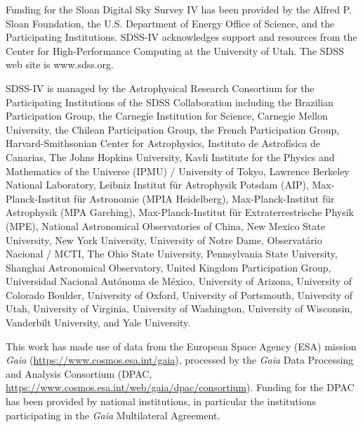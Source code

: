 \documentclass[modern]{aastex63}
\begin{document}
Funding for the Sloan Digital Sky Survey IV has been provided by the Alfred P.
Sloan Foundation, the U.S. Department of Energy Office of Science, and the
Participating Institutions. SDSS-IV acknowledges support and resources from the
Center for High-Performance Computing at the University of Utah. The SDSS web
site is www.sdss.org.

SDSS-IV is managed by the Astrophysical Research Consortium for the
Participating Institutions of the SDSS Collaboration including the Brazilian
Participation Group, the Carnegie Institution for Science, Carnegie Mellon
University, the Chilean Participation Group, the French Participation Group,
Harvard-Smithsonian Center for Astrophysics, Instituto de Astrof\'isica de
Canarias, The Johns Hopkins University, Kavli Institute for the Physics and
Mathematics of the Universe (IPMU) / University of Tokyo, Lawrence Berkeley
National Laboratory, Leibniz Institut f\"ur Astrophysik Potsdam (AIP),
Max-Planck-Institut f\"ur Astronomie (MPIA Heidelberg), Max-Planck-Institut
f\"ur Astrophysik (MPA Garching), Max-Planck-Institut f\"ur Extraterrestrische
Physik (MPE), National Astronomical Observatories of China, New Mexico State
University, New York University, University of Notre Dame, Observat\'ario
Nacional / MCTI, The Ohio State University, Pennsylvania State University,
Shanghai Astronomical Observatory, United Kingdom Participation Group,
Universidad Nacional Aut\'onoma de M\'exico, University of Arizona, University
of Colorado Boulder, University of Oxford, University of Portsmouth, University
of Utah, University of Virginia, University of Washington, University of
Wisconsin, Vanderbilt University, and Yale University.

This work has made use of data from the European Space Agency (ESA) mission
{\it Gaia} (\url{https://www.cosmos.esa.int/gaia}), processed by the {\it Gaia}
Data Processing and Analysis Consortium (DPAC,
\url{https://www.cosmos.esa.int/web/gaia/dpac/consortium}). Funding for the DPAC
has been provided by national institutions, in particular the institutions
participating in the {\it Gaia} Multilateral Agreement.

\end{document}
